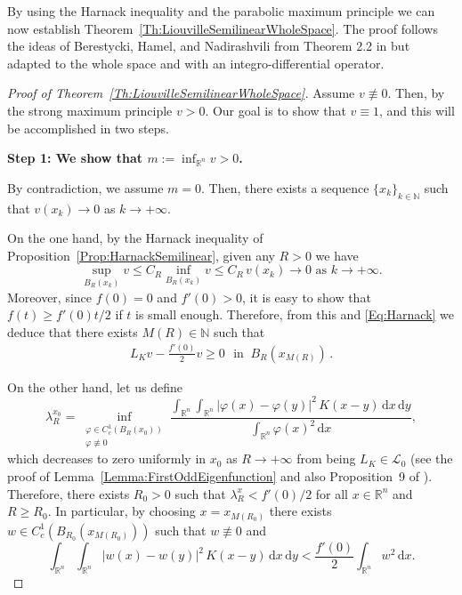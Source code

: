 \documentclass[12pt,reqno]{amsart}
\theoremstyle{definition}
\theoremstyle{remark}
\newcommand{\con}[1]{\mathbb{#1}}
\newcommand{\R}{\con{R}} %
\newcommand{\N}{\con{N}} %
\renewcommand{\d}{\,\mathrm{d}} %
\def\ds{\displaystyle}
\numberwithin{equation}{section}
\begin{document}
By using the Harnack inequality and the parabolic maximum principle we can now establish Theorem~\ref{Th:LiouvilleSemilinearWholeSpace}. The proof follows the ideas of Berestycki, Hamel, and Nadirashvili from Theorem 2.2 in \cite{BerestyckiHamelNadi} but adapted to the whole space and with an integro-differential operator.

\begin{proof}[Proof of Theorem~\ref{Th:LiouvilleSemilinearWholeSpace}]
	
	
	Assume $v\not\equiv 0$. Then, by the strong maximum principle $v>0$. Our goal is to show that $v\equiv 1$, and this will be accomplished in two steps.
	
	\textbf{Step 1: We show that $m:=\inf_{\R^n} v >0$.} 
	
	By contradiction, we assume $m=0$. Then, there exists a sequence $\{x_k\}_{k\in\N}$ such that $v(x_k)\rightarrow 0$ as $k \rightarrow +\infty$.
	
	On the one hand, by the Harnack inequality of Proposition~\ref{Prop:HarnackSemilinear}, given any $R>0$ we have 
	\begin{equation}
	\label{Eq:Harnack}
	\sup_{B_R(x_k)}v \leq C_R \inf_{B_R(x_k)}v \leq C_R \, v(x_k) \rightarrow 0 \,\,\text{as}\,\, k\rightarrow +\infty.
	\end{equation}
	Moreover, since $f(0) = 0 $ and $f'(0)>0$, it is easy to show that $f(t)\geq f'(0)t/2$ if $t$ is small enough. Therefore, from this and \eqref{Eq:Harnack}  we deduce that there exists $M(R)\in\N$ such that
	\begin{align}
	\label{Eq:WholeSpace2}
	L_K  v - \frac{f'(0)}{2}v \geq 0 \,\,\textrm{ in }\ B_R(x_{M(R)})\,.
	\end{align}
	
	
	On the other hand, let us define
	$$  \lambda_R^{x_0} = \inf_{\substack{\varphi\in C^1_c(B_R(x_0))\\ \varphi\not\equiv 0}} \frac{\ds \int_{\R^n}\int_{\R^n}|\varphi(x)-\varphi(y)|^2\,K(x-y) \d x \d y}{\ds \int_{\R^n}\varphi(x)^2 \d x}, 
	$$
	which decreases to zero uniformly in $x_0$ as $R\to +\infty$ from being $L_K \in\mathcal{L}_0$ (see the proof of Lemma~\ref{Lemma:FirstOddEigenfunction} and also Proposition~9 of \cite{ServadeiValdinoci}). Therefore, there exists $R_0>0$ such that $ \lambda_R^x < f'(0)/2$ for all $x\in \R^n$ and $R\geq R_0$. In particular, by choosing $x=x_{M(R_0)}$ there exists $w\in C^1_c(B_{R_0}(x_{M(R_0)}))$ such that $w\not\equiv 0$ and
	\begin{equation}
	\label{Eq:Eigenfunction}
	\int_{\R^n}\int_{\R^n}|w(x)-w(y)|^2\,K(x-y) \d x \d y < \frac{f'(0)}{2}\int_{\R^n}w^2 \d x.
	\end{equation}
	

\end{proof}
\end{document}
